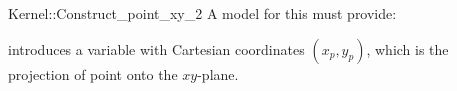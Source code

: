 \begin{ccRefFunctionObjectConcept}{Kernel::Construct_point_xy_2}
A model for this must provide:



            {introduces a variable with Cartesian coordinates $(x_p, y_p)$, 
             which is the projection of point  onto the $xy$-plane.}

\end{ccRefFunctionObjectConcept}

